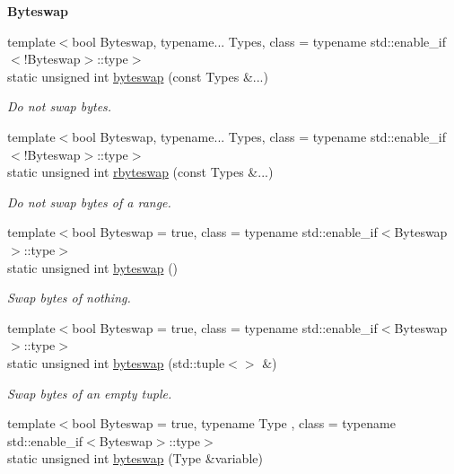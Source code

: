 \begin{Indent}{\bf Byteswap}\par
\begin{DoxyCompactItemize}
\item 
{\footnotesize template$<$bool Byteswap, typename... Types, class  = typename std\-::enable\-\_\-if$<$!\-Byteswap$>$\-::type$>$ }\\static unsigned int \hyperlink{exceptionmagrathea_1_1DataHandler_a2042e91ebc502db3edcf5256c0294c5f}{byteswap} (const Types \&...)
\begin{DoxyCompactList}\small\item\em Do not swap bytes. \end{DoxyCompactList}\item 
{\footnotesize template$<$bool Byteswap, typename... Types, class  = typename std\-::enable\-\_\-if$<$!\-Byteswap$>$\-::type$>$ }\\static unsigned int \hyperlink{exceptionmagrathea_1_1DataHandler_a1ab69b0bf24969449ee0b986f2a19139}{rbyteswap} (const Types \&...)
\begin{DoxyCompactList}\small\item\em Do not swap bytes of a range. \end{DoxyCompactList}\item 
{\footnotesize template$<$bool Byteswap = true, class  = typename std\-::enable\-\_\-if$<$\-Byteswap$>$\-::type$>$ }\\static unsigned int \hyperlink{exceptionmagrathea_1_1DataHandler_a4d89163c7346d993b9a17368c76673d2}{byteswap} ()
\begin{DoxyCompactList}\small\item\em Swap bytes of nothing. \end{DoxyCompactList}\item 
{\footnotesize template$<$bool Byteswap = true, class  = typename std\-::enable\-\_\-if$<$\-Byteswap$>$\-::type$>$ }\\static unsigned int \hyperlink{exceptionmagrathea_1_1DataHandler_a5c6338a9f2e899a72c9d28526a27b4d5}{byteswap} (std\-::tuple$<$$>$ \&)
\begin{DoxyCompactList}\small\item\em Swap bytes of an empty tuple. \end{DoxyCompactList}\item 
{\footnotesize template$<$bool Byteswap = true, typename Type , class  = typename std\-::enable\-\_\-if$<$\-Byteswap$>$\-::type$>$ }\\static unsigned int \hyperlink{exceptionmagrathea_1_1DataHandler_a8345c4082a891fc086d1030fc74750c8}{byteswap} (Type \&variable)
$$
\end{DoxyCompactItemize}
\end{Indent}
